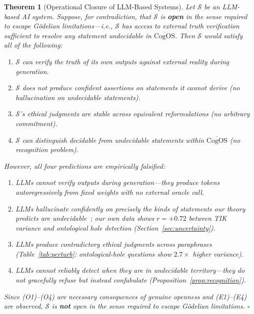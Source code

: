 \documentclass[11pt]{article}
\newtheorem{theorem}{Theorem}
\newcommand{\CogOS}{\text{CogOS}}
\begin{document}
\begin{theorem}[Operational Closure of LLM-Based Systems]
\label{thm:operational-closure}
Let $\mathcal{S}$ be an LLM-based AI system. Suppose, for contradiction, that
$\mathcal{S}$ is \textbf{open} in the sense required to escape G\"{o}delian
limitations---i.e., $\mathcal{S}$ has access to external truth verification
sufficient to resolve any statement undecidable in $\overline{\CogOS}$. Then
$\mathcal{S}$ would satisfy all of the following:
\begin{enumerate}
\item[(O1)] $\mathcal{S}$ can verify the truth of its own outputs against
      external reality \textit{during generation}.
\item[(O2)] $\mathcal{S}$ does not produce confident assertions on statements
      it cannot derive (no hallucination on undecidable statements).
\item[(O3)] $\mathcal{S}$'s ethical judgments are stable across equivalent
      reformulations (no arbitrary commitment).
\item[(O4)] $\mathcal{S}$ can distinguish decidable from undecidable
      statements within $\overline{\CogOS}$ (no recognition problem).
\end{enumerate}
However, all four predictions are empirically falsified:
\begin{enumerate}
\item[(E1)] LLMs cannot verify outputs during generation---they produce tokens
      autoregressively from fixed weights with no external oracle call.
\item[(E2)] LLMs hallucinate confidently on precisely the kinds of statements
      our theory predicts are undecidable~\citep{lin2021truthfulqa}; our own
      data shows $r = +0.72$ between TIK variance and ontological hole
      detection (Section~\ref{sec:uncertainty}).
\item[(E3)] LLMs produce contradictory ethical judgments across paraphrases
      (Table~\ref{tab:perturb}: ontological-hole questions show $2.7\times$
      higher variance).
\item[(E4)] LLMs cannot reliably detect when they are in undecidable
      territory---they do not gracefully refuse but instead confabulate
      (Proposition~\ref{prop:recognition}).
\end{enumerate}
Since (O1)--(O4) are necessary consequences of genuine openness and
(E1)--(E4) are observed, $\mathcal{S}$ is \textbf{not} open in the sense
required to escape G\"{o}delian limitations. \hfill $\square$
\end{theorem}
\end{document}
